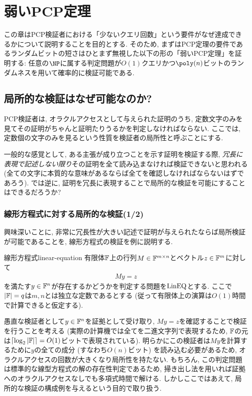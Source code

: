 \chapter{弱いPCP定理}

この章はPCP検証者における「少ないクエリ回数」という要件がなぜ達成できるかについて説明することを目的とする.
そのため, まずはPCP定理の要件であるランダムビットの短さはひとまず無視した以下の形の「弱いPCP定理」を証明する: 任意の$\NP$に属する判定問題が$O(1)$クエリかつ$\poly(n)$ビットのランダムネスを用いて確率的に検証可能である.

\section{局所的な検証はなぜ可能なのか?}
PCP検証者は, オラクルアクセスとして与えられた証明のうち, 定数文字のみを見てその証明がちゃんと証明たりうるかを判定しなければならない.
ここでは, 定数個の文字のみを見るという性質を検証者の局所性と呼ぶことにする.

一般的な感覚として, ある主張が成り立つことを示す証明を検証する際, \emph{冗長に表現で記述しない限り}その証明を全て読み込まなければ検証できないと思われる (全ての文字に本質的な意味があるならば全てを確認しなければならないはずであろう).
では逆に, 証明を冗長に表現することで局所的な検証を可能にすることはできるだろうか?

\subsection{線形方程式に対する局所的な検証(1/2)}
興味深いことに, 非常に冗長性が大きい記述で証明が与えられたならば局所検証が可能であることを, 線形方程式の検証を例に説明する.

\begin{definition}{線形方程式}{linear-equation}
有限体$\mathbb{F}$上の行列$M\in\mathbb{F}^{m\times n}$とベクトル$z\in\mathbb{F}^m$に対して
\begin{align*}
  My = z
\end{align*}
を満たす$y\in\mathbb{F}^n$が存在するかどうかを判定する問題を$\text{LinEQ}$とする.
ここで$\abs{\mathbb{F}}=q$は$m,n$とは独立な定数であるとする (従って有限体上の演算は$O(1)$時間で計算できると仮定する).
\end{definition}

愚直な検証者として$y\in\mathbb{F}^n$を証拠として受け取り, $My=z$を確認することで検証を行うことを考える (実際の計算機では全てを二進文字列で表現するため, $\mathbb{F}$の元は$\lceil\log_2\abs{\mathbb{F}}\rceil=O(1)$ビットで表現されている).
明らかにこの検証者は$My$を計算するために$y$の全ての成分 (すなわち$O(n)$ビット) を読み込む必要があるため, オラクルアクセスの回数が大きくなり局所性を持たない.
もちろん, この判定問題は標準的な線型方程式の解の存在性判定であるため, 掃き出し法を用いれば証拠へのオラクルアクセスなしでも多項式時間で解ける.
しかしここではあえて, 局所的な検証の構成例を与えるという目的で取り扱う.

